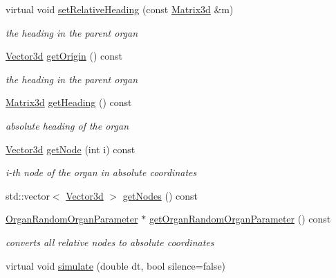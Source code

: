\begin{DoxyCompactItemize}
\mbox{\label{classCPlantBox_1_1Organ_a96ebcecf9a2acda92d3dd1d435ee64ff}} 
virtual void \hyperlink{classCPlantBox_1_1Organ_a96ebcecf9a2acda92d3dd1d435ee64ff}{set\+Relative\+Heading} (const \hyperlink{classCPlantBox_1_1Matrix3d}{Matrix3d} \&m)
\begin{DoxyCompactList}\small\item\em the heading in the parent organ \end{DoxyCompactList}\item 
\hyperlink{classCPlantBox_1_1Vector3d}{Vector3d} \hyperlink{classCPlantBox_1_1Organ_ac18526b4b44a40392a1f5db5ff2f6c72}{get\+Origin} () const
\begin{DoxyCompactList}\small\item\em the heading in the parent organ \end{DoxyCompactList}\item 
\hyperlink{classCPlantBox_1_1Matrix3d}{Matrix3d} \hyperlink{classCPlantBox_1_1Organ_a3436c97a754ba2b8633e0f47df3604d5}{get\+Heading} () const
\begin{DoxyCompactList}\small\item\em absolute heading of the organ \end{DoxyCompactList}\item 
\hyperlink{classCPlantBox_1_1Vector3d}{Vector3d} \hyperlink{classCPlantBox_1_1Organ_a17438f54d1d07af58867a4d257225e87}{get\+Node} (int i) const
\begin{DoxyCompactList}\small\item\em i-\/th node of the organ in absolute coordinates \end{DoxyCompactList}\item 
std\+::vector$<$ \hyperlink{classCPlantBox_1_1Vector3d}{Vector3d} $>$ \hyperlink{classCPlantBox_1_1Organ_af990e5df473327cb2cdb6293d5117419}{get\+Nodes} () const
\item 
\hyperlink{classCPlantBox_1_1OrganRandomOrganParameter}{Organ\+Random\+Organ\+Parameter} $\ast$ \hyperlink{classCPlantBox_1_1Organ_aa6668fc995d856d1a06c92af06155f00}{get\+Organ\+Random\+Organ\+Parameter} () const
\begin{DoxyCompactList}\small\item\em converts all relative nodes to absolute coordinates \end{DoxyCompactList}\item 
virtual void \hyperlink{classCPlantBox_1_1Organ_acf519fc6730c0adbb2a82b7702ff7a28}{simulate} (double dt, bool silence=false)

\end{DoxyCompactItemize}
